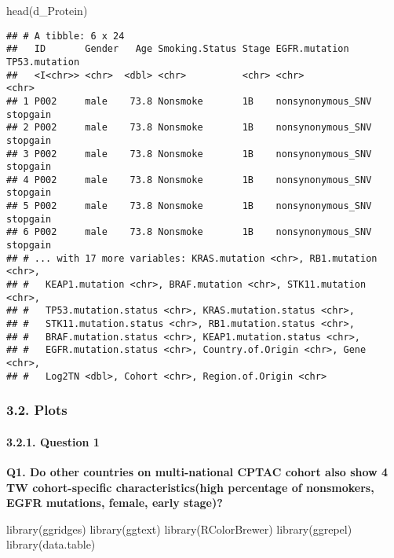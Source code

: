 \documentclass[
]{article}
\newenvironment{Shaded}{\begin{snugshade}}{\end{snugshade}}
\newcommand{\FunctionTok}[1]{\textcolor[rgb]{0.00,0.00,0.00}{#1}}
\newcommand{\NormalTok}[1]{#1}
\begin{document}
\begin{Shaded}
\begin{Highlighting}[]
\FunctionTok{head}\NormalTok{(d\_Protein)}
\end{Highlighting}
\end{Shaded}

\begin{verbatim}
## # A tibble: 6 x 24
##   ID       Gender   Age Smoking.Status Stage EGFR.mutation     TP53.mutation
##   <I<chr>> <chr>  <dbl> <chr>          <chr> <chr>             <chr>        
## 1 P002     male    73.8 Nonsmoke       1B    nonsynonymous_SNV stopgain     
## 2 P002     male    73.8 Nonsmoke       1B    nonsynonymous_SNV stopgain     
## 3 P002     male    73.8 Nonsmoke       1B    nonsynonymous_SNV stopgain     
## 4 P002     male    73.8 Nonsmoke       1B    nonsynonymous_SNV stopgain     
## 5 P002     male    73.8 Nonsmoke       1B    nonsynonymous_SNV stopgain     
## 6 P002     male    73.8 Nonsmoke       1B    nonsynonymous_SNV stopgain     
## # ... with 17 more variables: KRAS.mutation <chr>, RB1.mutation <chr>,
## #   KEAP1.mutation <chr>, BRAF.mutation <chr>, STK11.mutation <chr>,
## #   TP53.mutation.status <chr>, KRAS.mutation.status <chr>,
## #   STK11.mutation.status <chr>, RB1.mutation.status <chr>,
## #   BRAF.mutation.status <chr>, KEAP1.mutation.status <chr>,
## #   EGFR.mutation.status <chr>, Country.of.Origin <chr>, Gene <chr>,
## #   Log2TN <dbl>, Cohort <chr>, Region.of.Origin <chr>
\end{verbatim}

\hypertarget{plots}{%
\subsubsection{3.2. Plots}\label{plots}}

\hypertarget{question-1}{%
\paragraph{3.2.1. Question 1}\label{question-1}}

\textbf{Q1. Do other countries on multi-national CPTAC cohort also show
4 TW cohort-specific characteristics(high percentage of nonsmokers, EGFR
mutations, female, early stage)?}

\begin{Shaded}
\begin{Highlighting}[]
\FunctionTok{library}\NormalTok{(ggridges)}
\FunctionTok{library}\NormalTok{(ggtext)}
\FunctionTok{library}\NormalTok{(RColorBrewer)}
\FunctionTok{library}\NormalTok{(ggrepel)}
\FunctionTok{library}\NormalTok{(data.table)}
\end{Highlighting}
\end{Shaded}
\end{document}
